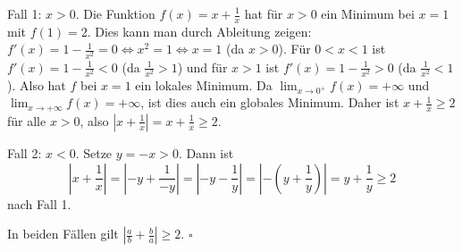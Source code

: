 \documentclass{article}
\newcommand{\abs}[1]{|#1|}
\begin{document}
Fall 1: $x > 0$. Die Funktion $f(x) = x + \frac{1}{x}$ hat für $x > 0$ ein Minimum bei $x = 1$ mit $f(1) = 2$.
Dies kann man durch Ableitung zeigen: $f'(x) = 1 - \frac{1}{x^2} = 0 \iff x^2 = 1 \iff x = 1$ (da $x > 0$).
Für $0 < x < 1$ ist $f'(x) = 1 - \frac{1}{x^2} < 0$ (da $\frac{1}{x^2} > 1$) und für $x > 1$ ist $f'(x) = 1 - \frac{1}{x^2} > 0$ (da $\frac{1}{x^2} < 1$).
Also hat $f$ bei $x = 1$ ein lokales Minimum. Da $\lim_{x \to 0^+} f(x) = +\infty$ und $\lim_{x \to +\infty} f(x) = +\infty$, ist dies auch ein globales Minimum.
Daher ist $x + \frac{1}{x} \geq 2$ für alle $x > 0$, also $\abs{x + \frac{1}{x}} = x + \frac{1}{x} \geq 2$.

Fall 2: $x < 0$. Setze $y = -x > 0$. Dann ist
\[\abs{x + \frac{1}{x}} = \abs{-y + \frac{1}{-y}} = \abs{-y - \frac{1}{y}} = \abs{-(y + \frac{1}{y})} = y + \frac{1}{y} \geq 2\]
nach Fall 1.

In beiden Fällen gilt $\abs{\frac{a}{b} + \frac{b}{a}} \geq 2$. $\square$
\end{document}
